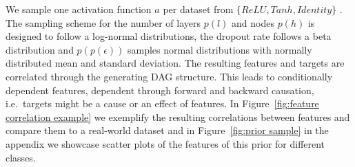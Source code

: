 \documentclass{article}
\newcommand{\frank}[1]{\todo[inline,color=yellow]{Frank: #1}}
\begin{document}
We sample one activation function $a$ per dataset from $\{ReLU, Tanh, Identity\}$ \citep{nair2010rectified}. The sampling scheme for the number of layers $p(l)$ and nodes $p(h)$ is designed to follow a log-normal distributions, the dropout rate follows a beta distribution and $p(p(\epsilon))$ samples normal distributions with normally distributed mean and standard deviation.
The resulting features and targets are correlated through the generating DAG structure. This leads to conditionally dependent features, dependent through forward and backward causation, i.e.\ targets might be a cause or an effect of features.
In Figure~\ref{fig:feature correlation example} we exemplify the resulting correlations between features and compare them to a real-world dataset and in Figure~\ref{fig:prior sample} in the appendix we showcase scatter plots of the features of this prior for different classes.
\end{document}
